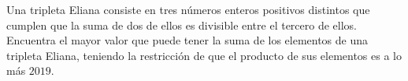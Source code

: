 Una tripleta Eliana consiste en tres números enteros positivos distintos que cumplen que la suma de dos de ellos es divisible entre el tercero de ellos. Encuentra el mayor valor que puede tener la suma de los elementos de una tripleta Eliana, teniendo la restricción de que el producto de sus elementos es a lo más $2019$.